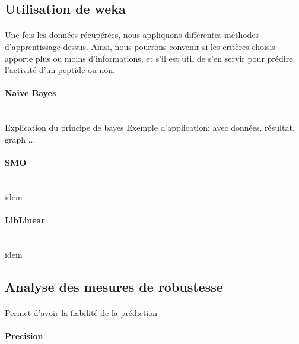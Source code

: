 \documentclass[a4paper,10pt]{report}
\begin{document}
	    
	 \subsection{Utilisation de weka}
	 
	    \paragraph{}
	    
	    Une fois les données récupérées, nous appliquons différentes méthodes d'apprentissage dessus.
	    Ainsi, nous pourrons convenir si les critères choisis apporte plus ou moins d'informations, et s'il est util de s'en servir pour prédire l'activité d'un peptide ou non. 
	    

	    \paragraph{Naive Bayes}
	    
	    ~\\Explication du principe de bayes
	    Exemple d'application: avec données, résultat, graph ...
	    
	    
	    \paragraph{SMO}
	    
	    ~\\idem 
	    
	    \paragraph{LibLinear}
	   
	    ~\\idem
	   
	 \subsection{Analyse des mesures de robustesse}
	     \paragraph{}
	     
	     Permet d'avoir la fiabilité de la prédiction
	     
	     \paragraph{Precision}
	      
\end{document}
